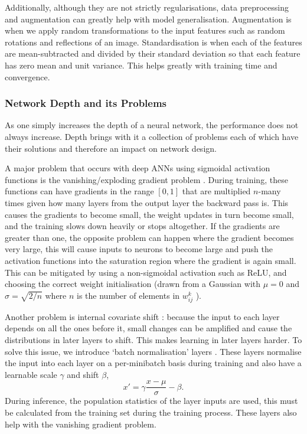 Additionally, although they are not strictly regularisations, data preprocessing and augmentation can greatly help with model generalisation. Augmentation is when we apply random transformations to the input features such as random rotations and reflections of an image. Standardisation is when each of the features are mean-subtracted and divided by their standard deviation so that each feature has zero mean and unit variance. This helps greatly with training time and convergence. 


\subsubsection{Network Depth and its Problems}
As one simply increases the depth of a neural network, the performance does not always increase. Depth brings with it a collection of problems each of which have their solutions and therefore an impact on network design. 

A major problem that occurs with deep ANNs using sigmoidal activation functions is the vanishing/exploding gradient problem \cite{VanishingGradient}. During training, these functions can have gradients in the range $[0,1]$ that are multiplied $n$-many times given how many layers from the output layer the backward pass is. This causes the gradients to become small, the weight updates in turn become small, and the training slows down heavily or stops altogether. If the gradients are greater than one, the opposite problem can happen where the gradient becomes very large, this will cause inputs to neurons to become large and push the activation functions into the saturation region where the gradient is again small. 
This can be mitigated by using a non-sigmoidal activation such as ReLU, and choosing the correct weight initialisation (drawn from a Gaussian with $\mu=0$ and $\sigma=\sqrt{2/n}$ where $n$ is the number of elements in $w_{ij}^{k}$ \cite{HeEtAl}). 

Another problem is internal covariate shift \cite{BatchNorm}: because the input to each layer depends on all the ones before it, small changes can be amplified and cause the distributions in later layers to shift. This makes learning in later layers harder. 
To solve this issue, we introduce `batch normalisation' layers \cite{BatchNorm}. These layers normalise the input into each layer on a per-minibatch basis during training and also have a learnable scale $\gamma$ and shift $\beta$,
\begin{equation}
    x{'}=\gamma\frac{x-\mu}{\sigma} - \beta.
\end{equation}
During inference, the population statistics of the layer inputs are used, this must be calculated from the training set during the training process. These layers also help with the vanishing gradient problem. 

